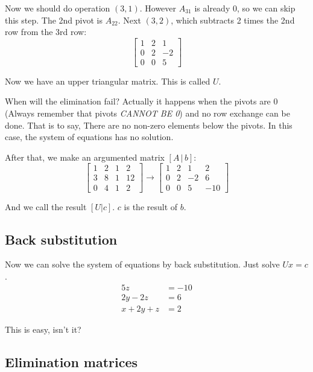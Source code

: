 \documentclass[10pt,a4paper,oneside,numbers=noenddot]{scrbook}
\theoremstyle{ctplain}
\theoremstyle{ctresult}
\begin{document}
Now we should do operation $(3, 1)$. However $A_{31}$ is already 0, so we can skip
this step. The 2nd pivot is $A_{22}$. Next $(3, 2)$, which subtracts 2 times the 2nd row
from the 3rd row:
\[
  \begin{bmatrix}
    1 & 2 & 1 \\
    0 & 2 & -2 \\
    0 & 0 & 5
  \end{bmatrix}
\]

Now we have an upper triangular matrix. This is called $U$.

When will the elimination fail? Actually it happens when the pivots are 0 (Always
remember that pivots \emph{CANNOT BE 0}) and no row exchange can be done. That is to
say, There are no non-zero elements below the pivots. In this case, the system of
equations has no solution.

After that, we make an argumented matrix $[A\,|\,b]$:
\[
  \left[
  \begin{array}{ccc|c}
    1 & 2 & 1 & 2 \\
    3 & 8 & 1 & 12 \\
    0 & 4 & 1 & 2
  \end{array}
  \right]
  \rightarrow
  \left[
  \begin{array}{ccc|c}
    1 & 2 & 1 & 2 \\
    0 & 2 & -2 & 6 \\
    0 & 0 & 5 & -10
  \end{array}
  \right]
\]

And we call the result $[U|c]$. $c$ is the result of $b$.

\subsection{Back substitution}

Now we can solve the system of equations by back substitution. Just solve $Ux = c$.
\begin{equation}
    \begin{aligned}
        5z &= -10 \\
        2y - 2z &= 6 \\
        x + 2y + z &= 2
    \end{aligned}
\end{equation}

This is easy, isn't it?

\subsection{Elimination matrices}
\end{document}
